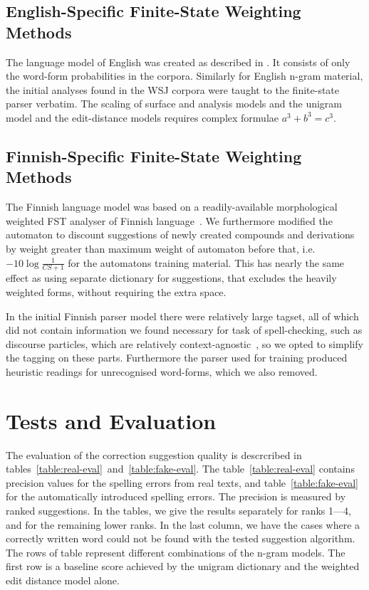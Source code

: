 \documentclass[11pt,a4paper]{article}
\begin{document}
\subsection{English-Specific Finite-State Weighting Methods}

The language model of English was created as described in \cite{norvig/2010}.
It consists of only the word-form probabilities in the corpora. Similarly for
English n-gram material, the initial analyses found in the WSJ corpora were
taught to the finite-state parser verbatim. The scaling of surface and analysis
models and the unigram model and the edit-distance models requires complex
formulae $a^3 + b^3 = c^3$.


\subsection{Finnish-Specific Finite-State Weighting Methods}

The Finnish language model was based on a readily-available morphological
weighted FST analyser of Finnish language~\cite{pirinen/2011/nodalida}.  We
furthermore modified the automaton to discount suggestions of newly created
compounds and derivations by weight greater than maximum weight of automaton
before that, i.e. $-10\log\frac{1}{CS+1}$ for the automatons training material.
This has nearly the same effect as using separate dictionary for suggestions,
that excludes the heavily weighted forms, without requiring the extra space.

In the initial Finnish parser model there were relatively large tagset, all of
which did not contain information we found necessary for task of
spell-checking, such as discourse particles, which are relatively
context-agnostic~\cite{visk}, so we opted to simplify the tagging on these
parts. Furthermore the parser used for training produced heuristic readings for
unrecognised word-forms, which we also removed.

\section{Tests and Evaluation}
\label{sec:evaluation}

The evaluation of the correction suggestion quality is descrcribed in
tables~\ref{table:real-eval}~and~\ref{table:fake-eval}. The
table~\ref{table:real-eval} contains precision values for the spelling errors
from real texts, and table~\ref{table:fake-eval} for the automatically
introduced spelling errors. The precision is measured by ranked suggestions. In
the tables, we give the results separately for ranks 1---4, and for the
remaining lower ranks.  In the last column, we have the cases where a correctly
written word could not be found with the tested suggestion algorithm.  The rows
of table represent different combinations of the n-gram models. The first row
is a baseline score achieved by the unigram dictionary and the weighted edit
distance model alone.
\end{document}
